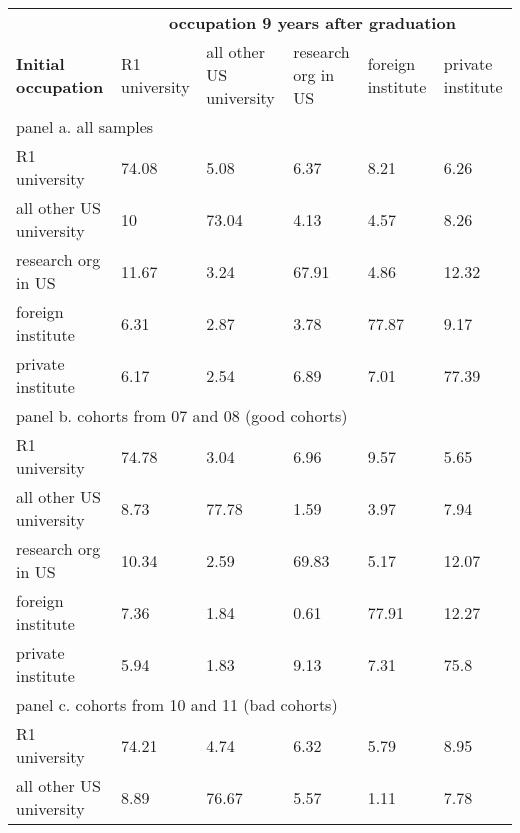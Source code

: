 \begin{table}[htbp]
	\centering
     	\begin{adjustbox}{max width=1\textwidth}
		\begin{tabular}{llllll}
			\hline\hline
			&\multicolumn{5}{c}{\textbf{occupation  9 years after graduation} } \\
			\textbf{Initial occupation}& R1 university     & all other US university     & research org in US     & foreign institute     & private institute    \\ \hline
			\multicolumn{6}{l}{panel a. all samples} \\ \hline
			R1 university       & {\color{blue}74.08} & 5.08  & 6.37  & 8.21  & 6.26  \\
			all other US university        & 10    & {\color{blue}73.04} & 4.13  & 4.57  & 8.26  \\
			research org in US        & 11.67 & 3.24  & {\color{blue}67.91} & 4.86  & 12.32 \\
			foreign institute       & 6.31  & 2.87  & 3.78  & {\color{blue}77.87} & 9.17  \\
			private institute       & 6.17  & 2.54  & 6.89  & 7.01  & {\color{blue}77.39} \\ \hline
			\multicolumn{6}{l}{panel b. cohorts from 07 and 08 (good cohorts)} \\ \hline
			R1 university       & {\color{blue}74.78} & 3.04  & 6.96  & 9.57  & 5.65  \\
			all other US university        & 8.73  & {\color{blue}77.78} & 1.59  & 3.97  & 7.94  \\
			research org in US        & 10.34 & 2.59  & {\color{blue}69.83} & 5.17  & 12.07 \\
			foreign institute       & 7.36  & 1.84  & 0.61  & {\color{blue}77.91} & 12.27 \\
			private institute       & 5.94  & 1.83  & 9.13  & 7.31  & {\color{blue}75.8}  \\ \hline
			\multicolumn{6}{l}{panel c. cohorts from 10 and 11 (bad cohorts)} \\ \hline
			R1 university       & {\color{blue}74.21} & 4.74  & 6.32  & 5.79  & 8.95  \\
			all other US university        & 8.89  & {\color{blue}76.67} & 5.57  & 1.11  & 7.78  \\

\end{tabular}
\end{adjustbox}
\end{table}
